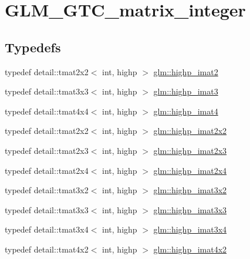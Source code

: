 \hypertarget{group__gtc__matrix__integer}{}\section{G\+L\+M\+\_\+\+G\+T\+C\+\_\+matrix\+\_\+integer}
\label{group__gtc__matrix__integer}
\subsection*{Typedefs}
\begin{DoxyCompactItemize}
\item 
typedef detail\+::tmat2x2$<$ int, highp $>$ \hyperlink{group__gtc__matrix__integer_ga70eae282157f23589db24f4664bbf956}{glm\+::highp\+\_\+imat2}
\item 
typedef detail\+::tmat3x3$<$ int, highp $>$ \hyperlink{group__gtc__matrix__integer_gaf12b3aa7e16a88b1fcf51be9a132048c}{glm\+::highp\+\_\+imat3}
\item 
typedef detail\+::tmat4x4$<$ int, highp $>$ \hyperlink{group__gtc__matrix__integer_ga9ca2f5624891bd1ac993fcde4dd24ac1}{glm\+::highp\+\_\+imat4}
\item 
typedef detail\+::tmat2x2$<$ int, highp $>$ \hyperlink{group__gtc__matrix__integer_ga9646ff5ef973234755e63e727c5a37fc}{glm\+::highp\+\_\+imat2x2}
\item 
typedef detail\+::tmat2x3$<$ int, highp $>$ \hyperlink{group__gtc__matrix__integer_ga7b7079ab95ac8f533ac565fcf1341c76}{glm\+::highp\+\_\+imat2x3}
\item 
typedef detail\+::tmat2x4$<$ int, highp $>$ \hyperlink{group__gtc__matrix__integer_ga84aec2e744ecac589fe8d502266e8efc}{glm\+::highp\+\_\+imat2x4}
\item 
typedef detail\+::tmat3x2$<$ int, highp $>$ \hyperlink{group__gtc__matrix__integer_ga9780c1bc052a34c59dc95f4dd9e1a5c8}{glm\+::highp\+\_\+imat3x2}
\item 
typedef detail\+::tmat3x3$<$ int, highp $>$ \hyperlink{group__gtc__matrix__integer_ga4e7c11e49de5d71067b95a87c84308a8}{glm\+::highp\+\_\+imat3x3}
\item 
typedef detail\+::tmat3x4$<$ int, highp $>$ \hyperlink{group__gtc__matrix__integer_ga97ddf84f7ae0c5d4d3ecc18bb1d47449}{glm\+::highp\+\_\+imat3x4}
\item 
typedef detail\+::tmat4x2$<$ int, highp $>$ \hyperlink{group__gtc__matrix__integer_gad998dce143f674a95a25241ff6e5e7d2}{glm\+::highp\+\_\+imat4x2}
\item 

\end{DoxyCompactItemize}
